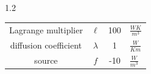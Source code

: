 \documentclass[preview]{standalone}
\begin{document}
\begin{spacing}{1.2}
\begin{tabular}{cccl}
\toprule
Lagrange multiplier & $\ell$ & 100 & $\frac{W K}{m^3}$ \\ 
diffusion coefficient & $\lambda$ & 1 & $\frac{W}{K m}$ \\ 
source & $f$ & -10 & $\frac{W}{m^3}$ \\ 
\bottomrule
\end{tabular}
\end{spacing}
\end{document}
